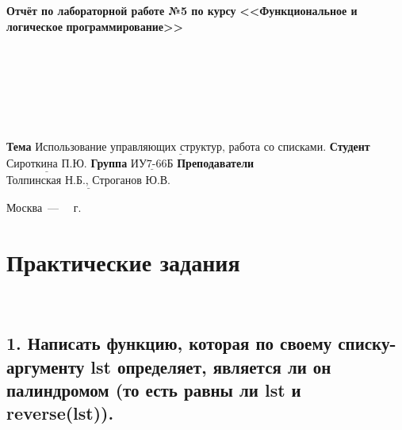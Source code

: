 \documentclass[12pt]{report}
\begin{document}
\begin{titlepage}
	
	\begin{center}
		\noindent\begin{minipage}{1.3\textwidth}\centering
			\Large\textbf{  Отчёт по лабораторной работе №5 по курсу}\newline\newline
			\textbf{<<Функциональное и логическое}\newline
			\textbf{\indent\indent\indent программирование>>}\newline
		\end{minipage}
	\end{center}
	
	~\\\\\\\\\\\\
	\large
	\noindent\textbf{Тема } $\underline{\text{Использование управляющих структур, работа со списками.}}$\newline\newline
	\noindent\textbf{Студент } $\underline{\text{Сироткина П.Ю.}}$\newline\newline
	\noindent\textbf{Группа } $\underline{\text{ИУ7-66Б}}$\newline\newline
	\noindent\textbf{Преподаватели } $\underline{\text{Толпинская Н.Б., Строганов Ю.В.}}$\newline\newline\newline
	
	\begin{center}
		\vfill
		Москва~---~\the\year
		~г.
	\end{center}
\end{titlepage}

\chapter*{\Large Практические задания}

~\

\section*{1. Написать функцию, которая по своему списку-аргументу lst определяет, является ли он палиндромом (то есть равны ли lst и reverse(lst)).}
\end{document}
